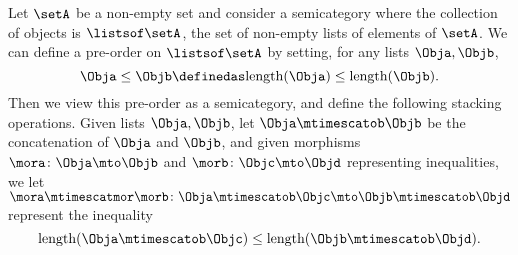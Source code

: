 \begin{example}\label{ex:assoc-stacking-semicat-lists-concat}
    Let $\setA$ be a non-empty set and consider a semicategory where the collection of objects is $ \listsof \setA$, the set of non-empty lists of elements of $\setA$.
    We can define a pre-order on $\listsof \setA$ by setting, for any lists $\Obja, \Objb$,
    \begin{equation}
        \Obja \leq \Objb \definedas \text{length}(\Obja) \leq \text{length}(\Objb).
    \end{equation}
    Then we view this pre-order as a semicategory, and define the following stacking operations.
    Given lists $\Obja, \Objb$, let $\Obja \mtimescatob \Objb$ be the concatenation of $\Obja$ and $\Objb$, and given morphisms $\mora \colon \Obja \mto \Objb$ and $\morb \colon \Objc \mto \Objd$ representing inequalities, we let $\mora \mtimescatmor \morb \colon \Obja \mtimescatob \Objc \mto \Objb \mtimescatob \Objd$ represent the inequality
    \begin{equation}
        \text{length}(\Obja \mtimescatob \Objc) \leq \text{length}(\Objb \mtimescatob \Objd).
    \end{equation}

\end{example}

